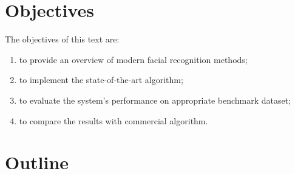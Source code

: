 \section{Objectives}\label{sec:objectives}
The objectives of this text are:
\begin{enumerate}
    \item to provide an overview of modern facial recognition methods;
    \item to implement the state-of-the-art algorithm;
    \item to evaluate the system's performance on appropriate benchmark dataset;
    \item to compare the results with commercial algorithm.
\end{enumerate}

\section{Outline}\label{sec:outline}